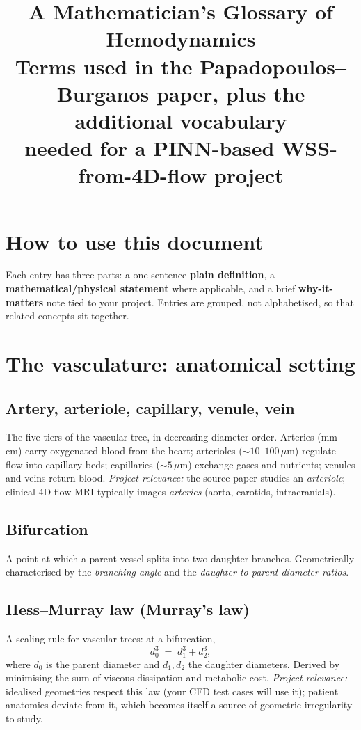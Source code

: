 \documentclass[11pt]{article}
\title{\bfseries A Mathematician's Glossary of Hemodynamics\\[0.3em]
\large Terms used in the Papadopoulos--Burganos paper, plus the additional vocabulary\\
needed for a PINN-based WSS-from-4D-flow project}
\author{}
\date{}
\begin{document}
\maketitle

\section*{How to use this document}

Each entry has three parts: a one-sentence \textbf{plain definition}, a \textbf{mathematical/physical statement} where applicable, and a brief \textbf{why-it-matters} note tied to your project. Entries are grouped, not alphabetised, so that related concepts sit together.

\section{The vasculature: anatomical setting}

\subsection*{Artery, arteriole, capillary, venule, vein}
The five tiers of the vascular tree, in decreasing diameter order. Arteries (mm--cm) carry oxygenated blood from the heart; arterioles ($\sim 10$--$100\,\mu$m) regulate flow into capillary beds; capillaries ($\sim 5\,\mu$m) exchange gases and nutrients; venules and veins return blood. \textit{Project relevance:} the source paper studies an \emph{arteriole}; clinical 4D-flow MRI typically images \emph{arteries} (aorta, carotids, intracranials).

\subsection*{Bifurcation}
A point at which a parent vessel splits into two daughter branches. Geometrically characterised by the \emph{branching angle} and the \emph{daughter-to-parent diameter ratios}.

\subsection*{Hess--Murray law (Murray's law)}
A scaling rule for vascular trees: at a bifurcation,
\[
d_0^3 \;=\; d_1^3 + d_2^3,
\]
where $d_0$ is the parent diameter and $d_1, d_2$ the daughter diameters. Derived by minimising the sum of viscous dissipation and metabolic cost. \textit{Project relevance:} idealised geometries respect this law (your CFD test cases will use it); patient anatomies deviate from it, which becomes itself a source of geometric irregularity to study.
\end{document}
